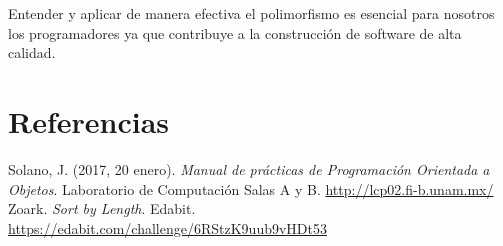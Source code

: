 \documentclass[11pt, twocolumn]{article}
\begin{document}
  Entender y aplicar de manera efectiva el polimorfismo es esencial para nosotros los programadores ya que contribuye a la construcción de software de alta calidad.


  \section*{Referencias}
  \small
  Solano, J. (2017, 20 enero). \textit{Manual de prácticas de Programación Orientada a Objetos}. Laboratorio de Computación Salas A y B. \url{http://lcp02.fi-b.unam.mx/} \\

  Zoark. \textit{Sort by Length}. Edabit. \url{https://edabit.com/challenge/6RStzK9uub9vHDt53}
\end{document}
